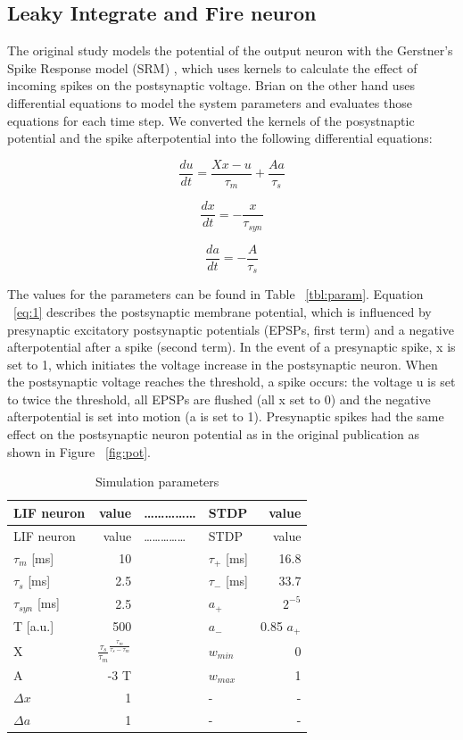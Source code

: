 \documentclass[10pt,a4paper,onecolumn]{article}
\begin{document}
\subsection{Leaky Integrate and Fire
neuron}\label{leaky-integrate-and-fire-neuron}

The original study models the potential of the output neuron with the
Gerstner's Spike Response model (SRM) \cite{Gerstner2002}, which uses
kernels to calculate the effect of incoming spikes on the postsynaptic
voltage. Brian on the other hand uses differential equations to model
the system parameters and evaluates those equations for each time step.
We converted the kernels of the posystnaptic potential and the spike
afterpotential into the following differential equations:

\begin{equation}\frac{du}{dt} = \frac{Xx - u}{\tau_{m}} + \frac{Aa}{\tau_{s}} \label{eq:u} \label{eq:1}\end{equation}

\begin{equation}\frac{dx}{dt} = -\frac{x}{\tau_{syn}}\label{eq:2}\end{equation}

\begin{equation}\frac{da}{dt} = -\frac{A}{\tau_{s}}\label{eq:3}\end{equation}

The values for the parameters can be found in Table ~\ref{tbl:param}.
Equation ~\ref{eq:1} describes the postsynaptic membrane potential,
which is influenced by presynaptic excitatory postsynaptic potentials
(EPSPs, first term) and a negative afterpotential after a spike (second
term). In the event of a presynaptic spike, x is set to 1, which
initiates the voltage increase in the postsynaptic neuron. When the
postsynaptic voltage reaches the threshold, a spike occurs: the voltage
u is set to twice the threshold, all EPSPs are flushed (all x set to 0)
and the negative afterpotential is set into motion (a is set to 1).
Presynaptic spikes had the same effect on the postsynaptic neuron
potential as in the original publication as shown in Figure
~\ref{fig:pot}.

\hypertarget{tbl:simt}{}
\begin{longtable}[]{@{}lrllr@{}}
\caption{\label{tbl:simt}Simulation parameters}\tabularnewline
\toprule
LIF neuron & value & \ldots{}\ldots{}\ldots{}\ldots{}\ldots{} & STDP &
value\tabularnewline
\midrule
\endfirsthead
\toprule
LIF neuron & value & \ldots{}\ldots{}\ldots{}\ldots{}\ldots{} & STDP &
value\tabularnewline
\midrule
\endhead
\(\tau_{m}\) {[}ms{]} & 10 & & \(\tau_{+}\) {[}ms{]} &
16.8\tabularnewline
\(\tau_{s}\) {[}ms{]} & 2.5 & & \(\tau_{-}\) {[}ms{]} &
33.7\tabularnewline
\(\tau_{syn}\) {[}ms{]} & 2.5 & & \(a_{+}\) & \(2^{-5}\)\tabularnewline
T {[}a.u.{]} & 500 & & \(a_{-}\) & 0.85 \(a_{+}\)\tabularnewline
X & \(\frac{\tau_{s}}{\tau_{m}}^{\frac{\tau_{m}}{\tau_{s} -\tau_{m}}}\)
& & \(w_{min}\) & 0\tabularnewline
A & -3 T & & \(w_{max}\) & 1\tabularnewline
\(\Delta x\) & 1 & & - & -\tabularnewline
\(\Delta a\) & 1 & & - & -\tabularnewline
\bottomrule
\end{longtable}
\end{document}
